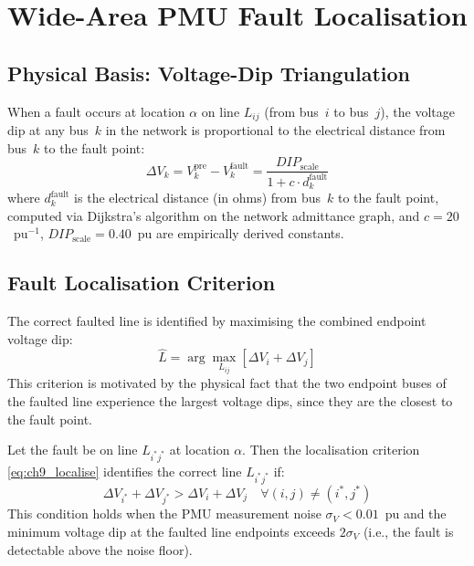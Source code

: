 \section{Wide-Area PMU Fault Localisation}
\label{sec:ch11_wapc}

\subsection{Physical Basis: Voltage-Dip Triangulation}

When a fault occurs at location $\alpha$ on line $L_{ij}$ (from bus~$i$
to bus~$j$), the voltage dip at any bus~$k$ in the network is proportional
to the electrical distance from bus~$k$ to the fault point:
\begin{equation}
  \Delta V_k = V_k^\mathrm{pre} - V_k^\mathrm{fault}
  = \frac{DIP_\mathrm{scale}}{1 + c \cdot d_k^\mathrm{fault}}
  \label{eq:ch9_dip_model}
\end{equation}
where $d_k^\mathrm{fault}$ is the electrical distance (in ohms) from
bus~$k$ to the fault point, computed via Dijkstra's algorithm on the
network admittance graph, and $c = 20$~pu$^{-1}$, $DIP_\mathrm{scale} = 0.40$~pu
are empirically derived constants.

\subsection{Fault Localisation Criterion}

The correct faulted line is identified by maximising the combined endpoint
voltage dip:
\begin{equation}
  \hat{L} = \arg\max_{L_{ij}} \left[\Delta V_i + \Delta V_j\right]
  \label{eq:ch9_localise}
\end{equation}
This criterion is motivated by the physical fact that the two endpoint
buses of the faulted line experience the largest voltage dips, since they
are the closest to the fault point.

\begin{proposition}
\label{prop:ch9_localise}
Let the fault be on line $L_{i^\ast j^\ast}$ at location $\alpha$.
Then the localisation criterion \eqref{eq:ch9_localise} identifies
the correct line $L_{i^\ast j^\ast}$ if:
\begin{equation}
  \Delta V_{i^\ast} + \Delta V_{j^\ast} > \Delta V_i + \Delta V_j
  \quad \forall (i, j) \neq (i^\ast, j^\ast)
  \label{eq:ch9_correct_condition}
\end{equation}
This condition holds when the PMU measurement noise $\sigma_V < 0.01$~pu
and the minimum voltage dip at the faulted line endpoints exceeds
$2\sigma_V$ (i.e., the fault is detectable above the noise floor).
\end{proposition}

